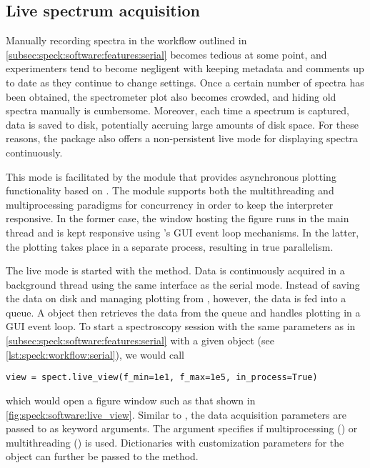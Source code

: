 \subsection{Live spectrum acquisition}\label{subsec:speck:software:features:live_view}
Manually recording spectra in the workflow outlined in \cref{subsec:speck:software:features:serial} becomes tedious at some point, and experimenters tend to become negligent with keeping metadata and comments up to date as they continue to change settings.
Once a certain number of spectra has been obtained, the spectrometer plot also becomes crowded, and hiding old spectra manually is cumbersome.
Moreover, each time a spectrum is captured, data is saved to disk, potentially accruing large amounts of disk space.
For these reasons, the \pyspeck package also offers a non-persistent live mode for displaying spectra continuously.

This mode is facilitated by the  module that provides asynchronous plotting functionality based on \matplotlib.
The  module supports both the multithreading and multiprocessing paradigms for concurrency in order to keep the interpreter responsive.
In the former case, the window hosting the figure runs in the main thread and is kept responsive using \matplotlib's GUI event loop mechanisms.
In the latter, the plotting takes place in a separate process, resulting in true parallelism.

The live mode is started with the  method.
Data is continuously acquired
in a background thread using the same  interface as the serial mode.
Instead of saving the data on disk and managing plotting from \pyspeck, however, the data is fed into a queue.
A  object then retrieves the data from the queue and handles plotting in a GUI event loop.
To start a spectroscopy session with the same parameters as in \cref{subsec:speck:software:features:serial} with a given  object (see \cref{lst:speck:workflow:serial}), we would call
\begin{verbatim}
view = spect.live_view(f_min=1e1, f_max=1e5, in_process=True)
\end{verbatim}
which would open a figure window such as that shown in \cref{fig:speck:software:live_view}.
Similar to , the data acquisition parameters are passed to  as keyword arguments.
The  argument specifies if multiprocessing () or multithreading () is used.
Dictionaries with customization parameters for the  object can further be passed to the method.

